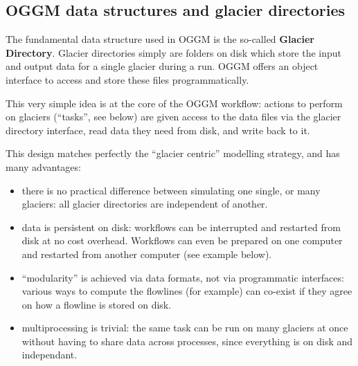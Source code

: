 \subsection{OGGM data structures and glacier directories}

The fundamental data structure used in OGGM is the so-called \textbf{Glacier Directory}. Glacier directories simply are
folders on disk which store the input and output data for a single glacier during a run. OGGM offers an object interface
to access and store these files programmatically.

This very simple idea is at the core of the OGGM workflow: actions to perform on glaciers (“tasks”, see below) are given
access to the data files via the glacier directory interface, read data they need from disk, and write back to it.

This design matches perfectly the “glacier centric” modelling strategy, and has many advantages:
\begin{itemize}
\item {} 
there is no practical difference between simulating one single, or many glaciers: all glacier directories are
independent of another.

\item {} 
data is persistent on disk: workflows can be interrupted and restarted from disk at no cost overhead. Workflows can
even be prepared on one computer and restarted from another computer (see example below).

\item {} 
“modularity” is achieved via data formats, not via programmatic interfaces: various ways to compute the flowlines (for
example) can co-exist if they agree on how a flowline is stored on disk.

\item {} 
multiprocessing is trivial: the same task can be run on many glaciers at once without having to share data across
processes, since everything is on disk and independant.

\end{itemize}

